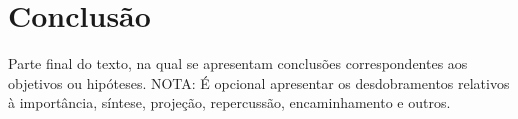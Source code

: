 \chapter{Conclusão}

Parte final do texto, na qual se apresentam conclusões correspondentes aos objetivos ou hipóteses. NOTA: É opcional apresentar os desdobramentos relativos à importância, síntese, projeção, repercussão, encaminhamento e outros. 
